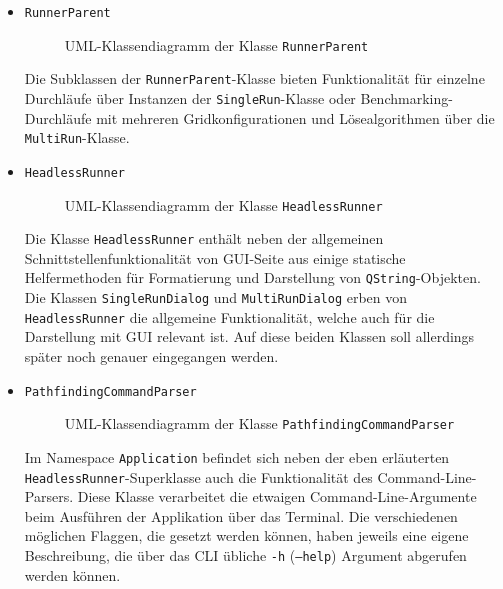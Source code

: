 \begin{itemize}
    \item \texttt{RunnerParent}\\
    \begin{figure}[H]
        \vspace{-0.5cm}
        \centering
        
        \caption{UML-Klassendiagramm der Klasse \texttt{RunnerParent}}
        \label{fig:uml_runner_parent}
    \end{figure}
    Die Subklassen der \texttt{RunnerParent}-Klasse bieten Funktionalität für einzelne Durchläufe über Instanzen der \texttt{SingleRun}-Klasse
    oder Benchmarking-Durchläufe mit mehreren Gridkonfigurationen und Lösealgorithmen über die \texttt{MultiRun}-Klasse.
    \item \texttt{HeadlessRunner}\\
    \begin{figure}[H]
        \vspace{-0.5cm}
        \centering
        
        \caption{UML-Klassendiagramm der Klasse \texttt{HeadlessRunner}}
        \label{fig:uml_headlessRunner}
    \end{figure}
    Die Klasse \texttt{HeadlessRunner} enthält neben der allgemeinen Schnittstellenfunktionalität von \ac{GUI}-Seite aus
    einige statische Helfermethoden für Formatierung und Darstellung von \texttt{QString}-Objekten.
    Die Klassen \texttt{Single\-RunDialog} und \texttt{MultiRunDialog} erben von \texttt{HeadlessRunner} die allgemeine Funktionalität,
    welche auch für die Darstellung mit \ac{GUI} relevant ist.
    Auf diese beiden Klassen soll allerdings später noch genauer eingegangen werden.

    \item \texttt{PathfindingCommandParser}
    \begin{figure}[H]
        \vspace{-0.5cm}
        \centering
        
        \caption{UML-Klassendiagramm der Klasse \texttt{PathfindingCommandParser}}
        \label{fig:uml_commandlineparser}
    \end{figure}
    Im Namespace \texttt{Application} befindet sich neben der eben erläuterten \\ \texttt{HeadlessRunner}-Superklasse auch die
    Funktionalität des Command-Line-Parsers.
    Diese Klasse verarbeitet die etwaigen Command-Line-Argumente beim Ausführen der Applikation über das Terminal.
    Die verschiedenen möglichen Flaggen, die gesetzt werden können, haben jeweils eine eigene Beschreibung, die über
    das \ac{CLI} übliche \texttt{-h} (\texttt{--help}) Argument abgerufen werden können.
\end{itemize}
